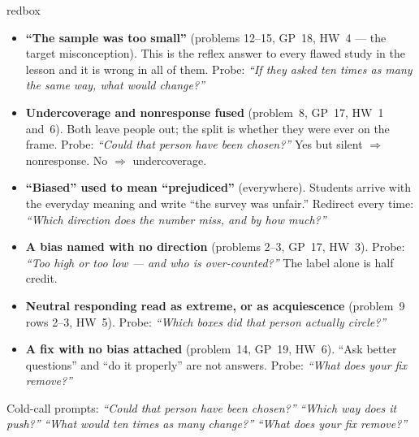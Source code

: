 \documentclass[10pt]{article}
\begin{document}
\boxguard
\begin{skillbox}{redbox}
\begin{itemize}[leftmargin=1.2em, nosep]
  \item \textbf{``The sample was too small''} (problems 12--15, GP~18, HW~4 --- the target
        misconception). This is the reflex answer to every flawed study in the lesson and it is
        wrong in all of them. Probe: \emph{``If they asked ten times as many the same way, what
        would change?''}
  \item \textbf{Undercoverage and nonresponse fused} (problem~8, GP~17, HW~1 and~6). Both
        leave people out; the split is whether they were ever on the frame. Probe: \emph{``Could
        that person have been chosen?''} Yes but silent $\Rightarrow$ nonresponse. No
        $\Rightarrow$ undercoverage.
  \item \textbf{``Biased'' used to mean ``prejudiced''} (everywhere). Students arrive with the
        everyday meaning and write ``the survey was unfair.'' Redirect every time:
        \emph{``Which direction does the number miss, and by how much?''}
  \item \textbf{A bias named with no direction} (problems 2--3, GP~17, HW~3). Probe: \emph{``Too high
        or too low --- and who is over-counted?''} The label alone is half credit.
  \item \textbf{Neutral responding read as extreme, or as acquiescence} (problem~9 rows
        2--3, HW~5). Probe: \emph{``Which boxes did that person actually circle?''}
  \item \textbf{A fix with no bias attached} (problem~14, GP~19, HW~6). ``Ask better
        questions'' and ``do it properly'' are not answers. Probe: \emph{``What does your fix
        remove?''}
\end{itemize}
Cold-call prompts: \emph{``Could that person have been chosen?''} \quad \emph{``Which way does
it push?''} \quad \emph{``What would ten times as many change?''} \quad \emph{``What does your
fix remove?''}
\end{skillbox}
\end{document}
